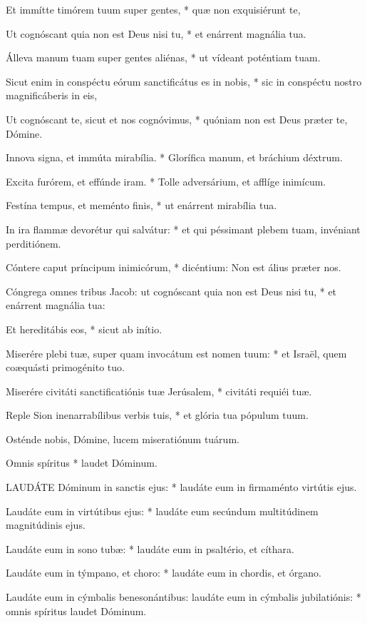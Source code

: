 Et immítte timórem tuum super gentes, * quæ non exquisiérunt te,

Ut cognóscant quia non est Deus nisi tu, * et enárrent magnália tua.

Álleva manum tuam super gentes aliénas, * ut vídeant poténtiam tuam.

Sicut enim in conspéctu eórum sanctificátus es in nobis, * sic in conspéctu nostro magnificáberis in eis,

Ut cognóscant te, sicut et nos cognóvimus, * quóniam non est Deus præter te, Dómine.

Innova signa, et immúta mirabília. * Glorífica manum, et bráchium déxtrum.

Excita furórem, et effúnde iram. * Tolle adversárium, et afflíge inimícum.

Festína tempus, et meménto finis, * ut enárrent mirabília tua.

In ira flammæ devorétur qui salvátur: * et qui péssimant plebem tuam, invéniant perditiónem.

Cóntere caput príncipum inimicórum, * dicéntium: Non est álius præter nos.

Cóngrega omnes tribus Jacob: ut cognóscant quia non est Deus nisi tu, * et enárrent magnália tua:

Et hereditábis eos, * sicut ab inítio.

Miserére plebi tuæ, super quam invocátum est nomen tuum: * et Israël, quem coæquásti primogénito tuo.

Miserére civitáti sanctificatiónis tuæ Jerúsalem, * civitáti requiéi tuæ.

Reple Sion inenarrabílibus verbis tuis, * et glória tua pópulum tuum.

 Osténde nobis, Dómine, lucem miseratiónum tuárum.

 Omnis spíritus * laudet Dóminum.


\lettrine[lines=2]{L}{AUDÁTE} Dóminum in sanctis ejus: * laudáte eum in firmaménto virtútis ejus.

Laudáte eum in virtútibus ejus: * laudáte eum secúndum multitúdinem magnitúdinis ejus.

Laudáte eum in sono tubæ: * laudáte eum in psaltério, et cíthara.

Laudáte eum in týmpano, et choro: * laudáte eum in chordis, et órgano.

Laudáte eum in cýmbalis benesonántibus: laudáte eum in cýmbalis jubilatiónis: * omnis spíritus laudet Dóminum.

